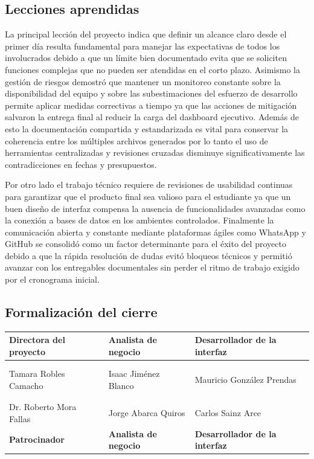 \documentclass[11pt,spanish]{article}
\begin{document}
\subsection{Lecciones aprendidas}

La principal lección del proyecto indica que definir un alcance claro desde el primer día resulta fundamental para manejar las expectativas de todos los involucrados debido a que un límite bien documentado evita que se soliciten funciones complejas que no pueden ser atendidas en el corto plazo. Asimismo la gestión de riesgos demostró que mantener un monitoreo constante sobre la disponibilidad del equipo y sobre las subestimaciones del esfuerzo de desarrollo permite aplicar medidas correctivas a tiempo ya que las acciones de mitigación salvaron la entrega final al reducir la carga del dashboard ejecutivo. Además de esto la documentación compartida y estandarizada es vital para conservar la coherencia entre los múltiples archivos generados por lo tanto el uso de herramientas centralizadas y revisiones cruzadas disminuye significativamente las contradicciones en fechas y presupuestos.

Por otro lado el trabajo técnico requiere de revisiones de usabilidad continuas para garantizar que el producto final sea valioso para el estudiante ya que un buen diseño de interfaz compensa la ausencia de funcionalidades avanzadas como la conexión a bases de datos en los ambientes controlados. Finalmente la comunicación abierta y constante mediante plataformas ágiles como WhatsApp y GitHub se consolidó como un factor determinante para el éxito del proyecto debido a que la rápida resolución de dudas evitó bloqueos técnicos y permitió avanzar con los entregables documentales sin perder el ritmo de trabajo exigido por el cronograma inicial.

\subsection{Formalización del cierre}

\begin{table}[H]
\centering
\begin{tabularx}{\textwidth}{Y Y Y}
\toprule
\textbf{Directora del proyecto} & \textbf{Analista de negocio} & \textbf{Desarrollador de la interfaz} \\
\midrule
& & \\
& & \\
Tamara Robles Camacho & Isaac Jiménez Blanco & Mauricio González Prendas \\
\midrule
& & \\
& & \\
Dr. Roberto Mora Fallas & Jorge Abarca Quiros & Carlos Sainz Arce \\
\textbf{Patrocinador} & \textbf{Analista de negocio} & \textbf{Desarrollador de la interfaz} \\
\bottomrule
\end{tabularx}
\end{table}
\end{document}
